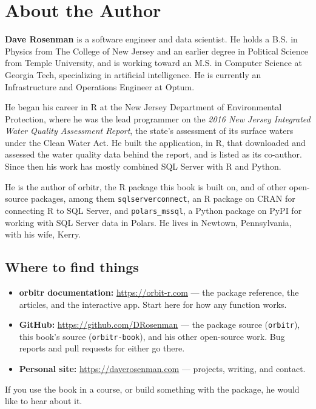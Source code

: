\documentclass[
  10.5pt,
  letterpaper,
]{scrbook}
\providecommand{\tightlist}{%
  \setlength{\itemsep}{0pt}\setlength{\parskip}{0pt}}
\theoremstyle{plain}
\theoremstyle{remark}
\begin{document}
\chapter*{About the Author}\label{about-the-author}


\textbf{Dave Rosenman} is a software engineer and data scientist. He
holds a B.S. in Physics from The College of New Jersey and an earlier
degree in Political Science from Temple University, and is working
toward an M.S. in Computer Science at Georgia Tech, specializing in
artificial intelligence. He is currently an Infrastructure and
Operations Engineer at Optum.

He began his career in R at the New Jersey Department of Environmental
Protection, where he was the lead programmer on the \emph{2016 New
Jersey Integrated Water Quality Assessment Report}, the state's
assessment of its surface waters under the Clean Water Act. He built the
application, in R, that downloaded and assessed the water quality data
behind the report, and is listed as its co-author. Since then his work
has mostly combined SQL Server with R and Python.

He is the author of orbitr, the R package this book is built on, and of
other open-source packages, among them \texttt{sqlserverconnect}, an R
package on CRAN for connecting R to SQL Server, and
\texttt{polars\_mssql}, a Python package on PyPI for working with SQL
Server data in Polars. He lives in Newtown, Pennsylvania, with his wife,
Kerry.

\section*{Where to find things}\label{where-to-find-things}


\begin{itemize}
\tightlist
\item
  \textbf{orbitr documentation:} \url{https://orbit-r.com} --- the
  package reference, the articles, and the interactive app. Start here
  for how any function works.
\item
  \textbf{GitHub:} \url{https://github.com/DRosenman} --- the package
  source (\texttt{orbitr}), this book's source (\texttt{orbitr-book}),
  and his other open-source work. Bug reports and pull requests for
  either go there.
\item
  \textbf{Personal site:} \url{https://daverosenman.com} --- projects,
  writing, and contact.
\end{itemize}

If you use the book in a course, or build something with the package, he
would like to hear about it.


\backmatter
\end{document}
